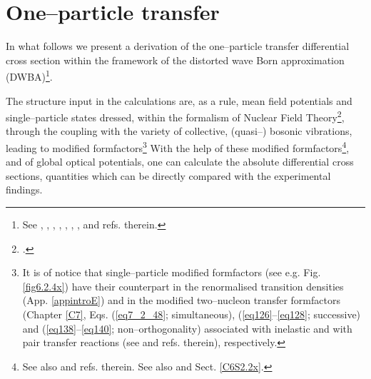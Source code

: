 \chapter{One--particle transfer}\label{C6}
In what follows we present a derivation of the one--particle transfer differential cross section within the framework of the distorted wave Born approximation (DWBA)\footnote{See \cite{Tobocman:61}, \cite{Austern:63}, \citet{Satchler:80,Broglia:04a}, \cite{Satchler:83}, \cite{Austern:70}, \cite{Glendenning:04}, \cite{Thompson:09},  and refs. therein.}.




 The structure input in the calculations are, as a rule, mean field potentials and single--particle states dressed, within the formalism of Nuclear Field Theory\footnote{ \cite{Bes:74,Bes:75,Bohr:75,Bes:76c,Bes:76a,Bes:76b,Mottelson:76,Broglia:76,Bes:77,Bortignon:77,Bes:90}.}, through the coupling with the variety of collective, (quasi--) bosonic vibrations, leading to modified formfactors\footnote{It is of notice that single--particle modified formfactors (see e.g. Fig. \ref{fig6.2.4x}) have their counterpart in the renormalised transition densities (App. \ref{appintroE})  and in the modified two--nucleon transfer formfactors (Chapter \ref{C7}, Eqs. (\ref{eq7_2_48}; simultaneous), (\ref{eq126}--\ref{eq128}; successive) and (\ref{eq138}--\ref{eq140}; non--orthogonality) associated with inelastic and with pair transfer  reactions  (see \cite{Broglia:73,Potel:13} and refs. therein), respectively.} With the help of these modified formfactors\footnote{See also \cite{Vaagen:79,Bang:80,Hamamoto:70} and refs. therein. See also \cite{Barranco:17} and Sect. \ref{C6S2.2x}.}, and of global optical potentials, one can calculate the absolute differential cross sections, quantities which can  be directly compared with the experimental findings.
	

